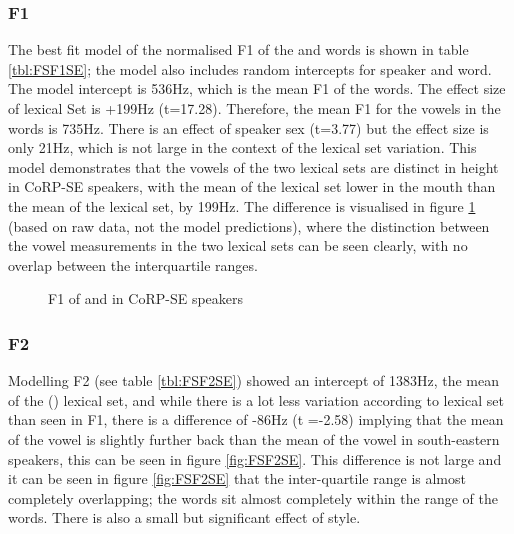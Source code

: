 \documentclass[../../../00.FullDoc/tex/ThesisSkeleton-draft2]{subfiles}
\begin{document}
\subsubsection{F1} \label{subsubsec:SEF1}
The best fit model of the normalised F1 of the \foot{}  and \strutt{}  words is shown in table \ref{tbl:FSF1SE}; the model also includes random intercepts for speaker and word. The model intercept is 536Hz, which is the mean F1 of the \foot{} words. The effect size of lexical Set is +199Hz (t=17.28). Therefore, the mean F1 for the vowels in the \strutt{} words is 735Hz. There is an effect of speaker sex (t=3.77) but the effect size is only 21Hz, which is not large in the context of the lexical set variation. This model demonstrates that the vowels of the two lexical sets are distinct in height in CoRP-SE speakers, with the mean of the \strutt{} lexical set lower in the mouth than the mean of the \foot{} lexical set, by 199Hz. The difference is visualised in figure \ref{fig:FSF1SE} (based on raw data, not the model predictions), where the distinction between the vowel measurements in the two lexical sets can be seen clearly, with no overlap between the interquartile ranges.



\begin{figure}[h]
	\centering
	
	\caption{F1 of \foot{} and \strutt{} in CoRP-SE speakers} \label{fig:FSF1SE}
\end{figure}

\subsubsection{F2} \label{subsubsec:SEF2}
Modelling F2 (see table \ref{tbl:FSF2SE}) showed an intercept of 1383Hz, the mean of the \foot() lexical set, and while there is a lot less variation according to lexical set than seen in F1, there is a difference of -86Hz (t =-2.58) implying that the mean of the \strutt{} vowel is slightly further back than the mean of the \foot{} vowel in south-eastern speakers, this can be seen in figure \ref{fig:FSF2SE}. This difference is not large and it can be seen in figure \ref{fig:FSF2SE} that the inter-quartile range is almost completely overlapping; the \strutt{} words sit almost completely within the range of the \foot{} words.
There is also a small but significant effect of style.


\end{document}
